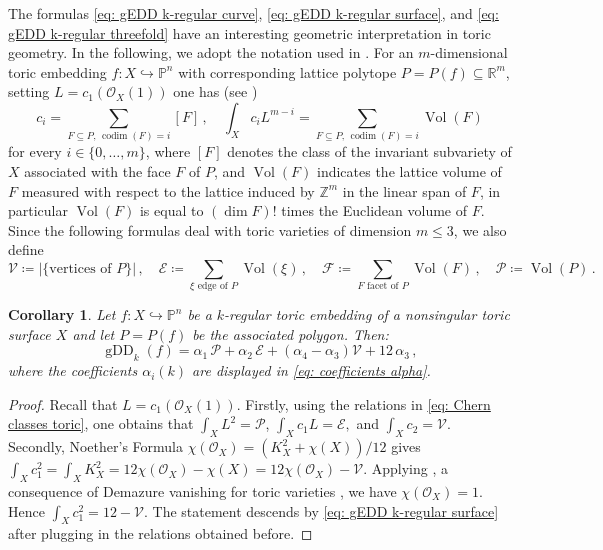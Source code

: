 \documentclass[11pt,reqno]{amsart}
\numberwithin{equation}{section}
\theoremstyle{plain}
\numberwithin{theorem}{section}
\newtheorem{corollary}[theorem]{Corollary}
\theoremstyle{definition}
\renewcommand{\P}{\mathbb{P}}
\newcommand{\Z}{\mathbb{Z}}
\newcommand{\R}{\mathbb{R}}
\newcommand{\VV}{\mathcal{V}}
\newcommand{\EE}{\mathcal{E}}
\newcommand{\FF}{\mathcal{F}}
\newcommand{\OO}{\mathcal{O}}
\newcommand{\PP}{\mathcal{P}}
\newcommand{\codim}{\operatorname{codim}}
\newcommand{\gDD}{\operatorname{gDD}}
\newcommand{\Vol}{\operatorname{Vol}}
\begin{document}
The formulas \eqref{eq: gEDD k-regular curve}, \eqref{eq: gEDD k-regular surface}, and \eqref{eq: gEDD k-regular threefold} have an interesting geometric interpretation in toric geometry. In the following, we adopt the notation used in \cite{Higher_duality_and_toric}. For an $m$-dimensional toric embedding $f\colon X\hookrightarrow\P^n$ with corresponding lattice polytope $P=P(f)\subseteq\R^m$, setting $L=c_1(\OO_X(1))$ one has (see \cite[Corollary 11.5]{danilov1978geometry})
\begin{equation}\label{eq: Chern classes toric}
    c_i=\sum_{F\subseteq P,\,\codim(F)=i}[F]\,,\quad \int_X c_iL^{m-i} = \sum_{F\subseteq P,\,\codim(F)=i}\Vol(F)
\end{equation}
for every $i\in\{0,\dots,m\}$, where $[F]$ denotes the class of the invariant subvariety of $X$ associated with the face $F$ of $P$, and $\Vol(F)$ indicates the lattice volume of $F$ measured with respect to the lattice induced by $\Z^m$ in the linear span of $F$, in particular $\Vol(F)$ is equal to $(\dim F)!$ times the Euclidean volume of $F$. Since the following formulas deal with toric varieties of dimension $m\le 3$, we also define
\[
\VV\coloneqq |\{\text{vertices of $P$}\}|\,,\quad\EE\coloneqq \sum_{\text{$\xi$ edge of $P$}
}\Vol(\xi)\,,\quad\FF\coloneqq \sum_{\text{$F$ facet of $P$}}\Vol(F)\,,\quad\PP\coloneqq\Vol(P)\,.
\]

\begin{corollary}\label{corol: gEDD k-regular toric surface}
Let $f\colon X\hookrightarrow\P^n$ be a $k$-regular toric embedding of a nonsingular toric surface $X$ and let $P=P(f)$ be the associated polygon. Then:
\begin{equation}\label{eq: gEDD k-regular toric surface}
\gDD_k(f) = \alpha_1\,\PP+\alpha_2\,\EE+(\alpha_4-\alpha_3)\VV+12\,\alpha_3\,,
\end{equation}
where the coefficients $\alpha_i(k)$ are displayed in \eqref{eq: coefficients alpha}.
\end{corollary}
\begin{proof}
Recall that $L=c_1(\OO_X(1))$. Firstly, using the relations in \eqref{eq: Chern classes toric}, one obtains that $\int_X L^2=\PP$, $\int_X c_1L=\EE,$ and $\int_X c_2=\VV.$ Secondly, Noether's Formula $\chi(\OO_X)=(K_X^2+\chi(X))/12$ \cite[IV,\S1]{griffiths1978principles} gives $\int_X c_1^2=\int_X K_X^2=12\chi(\OO_X)-\chi(X)=12\chi(\OO_X)-\VV$. Applying \cite[Corollary 7.4]{danilov1978geometry}, a consequence of Demazure vanishing for toric varieties \cite[Proposition 6, p. 564]{demazure1970sousgroupes}, we have $\chi(\OO_X)=1$. Hence $\int_Xc_1^2=12-\VV.$ The statement descends by \eqref{eq: gEDD k-regular surface} after plugging in the relations obtained before.
\end{proof}
\end{document}
